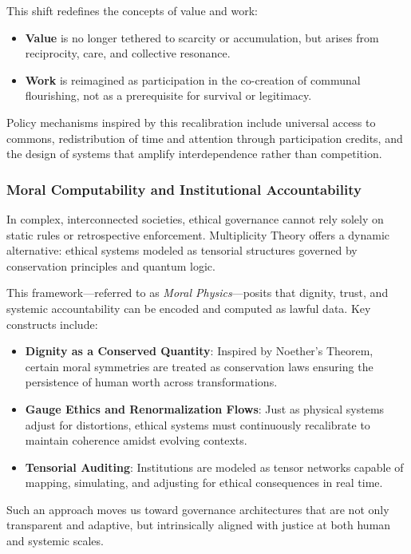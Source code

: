 \documentclass{article}
\theoremstyle{plain}
\theoremstyle{claimstyle}
\begin{document}
This shift redefines the concepts of value and work:

\begin{itemize}
    \item \textbf{Value} is no longer tethered to scarcity or accumulation, but arises from reciprocity, care, and collective resonance.
    \item \textbf{Work} is reimagined as participation in the co-creation of communal flourishing, not as a prerequisite for survival or legitimacy.
\end{itemize}

Policy mechanisms inspired by this recalibration include universal access to commons, redistribution of time and attention through participation credits, and the design of systems that amplify interdependence rather than competition.

\subsubsection{Moral Computability and Institutional Accountability}

In complex, interconnected societies, ethical governance cannot rely solely on static rules or retrospective enforcement. Multiplicity Theory offers a dynamic alternative: ethical systems modeled as tensorial structures governed by conservation principles and quantum logic.

This framework—referred to as \textit{Moral Physics}—posits that dignity, trust, and systemic accountability can be encoded and computed as lawful data. Key constructs include:

\begin{itemize}
    \item \textbf{Dignity as a Conserved Quantity}: Inspired by Noether's Theorem, certain moral symmetries are treated as conservation laws ensuring the persistence of human worth across transformations.
    \item \textbf{Gauge Ethics and Renormalization Flows}: Just as physical systems adjust for distortions, ethical systems must continuously recalibrate to maintain coherence amidst evolving contexts.
    \item \textbf{Tensorial Auditing}: Institutions are modeled as tensor networks capable of mapping, simulating, and adjusting for ethical consequences in real time.
\end{itemize}

Such an approach moves us toward governance architectures that are not only transparent and adaptive, but intrinsically aligned with justice at both human and systemic scales.
\end{document}
